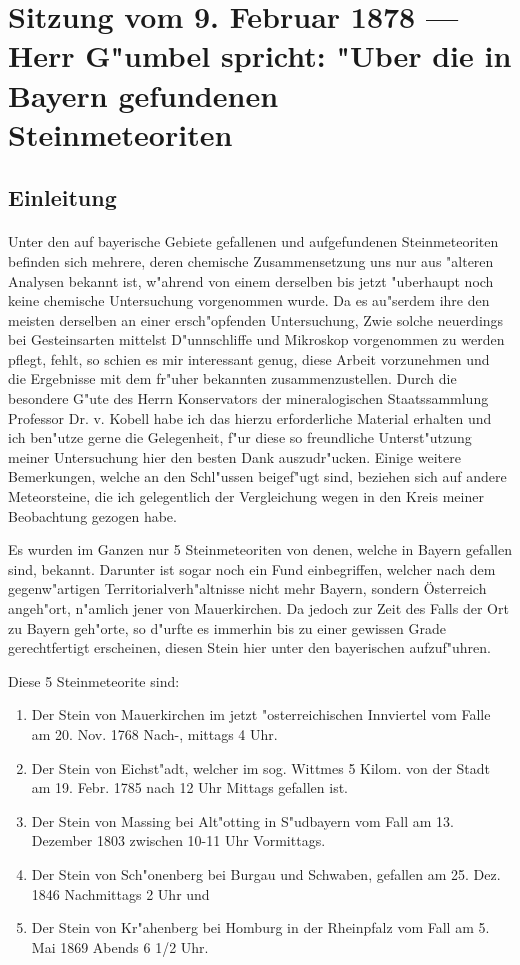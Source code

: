 \documentclass[a4paper, 11pt, oneside]{article}
\begin{document}
\section{Sitzung vom 9. Februar 1878 --- Herr G"umbel spricht: "Uber die in Bayern gefundenen Steinmeteoriten}
\subsection*{Einleitung}
\paragraph{}
Unter den auf bayerische Gebiete gefallenen und aufgefundenen Steinmeteoriten befinden sich mehrere, deren chemische Zusammensetzung uns nur aus "alteren Analysen bekannt ist, w"ahrend von einem derselben bis jetzt "uberhaupt noch keine chemische Untersuchung vorgenommen wurde. Da es au"serdem ihre den meisten derselben an einer ersch"opfenden Untersuchung, Zwie solche neuerdings bei Gesteinsarten mittelst D"unnschliffe und Mikroskop vorgenommen zu werden pflegt, fehlt, so schien es mir interessant genug, diese Arbeit vorzunehmen und die Ergebnisse mit dem fr"uher bekannten zusammenzustellen. Durch die besondere G"ute des Herrn Konservators der mineralogischen Staatssammlung Professor Dr. v. Kobell habe ich das hierzu erforderliche Material erhalten und ich ben"utze gerne die Gelegenheit, f"ur diese so freundliche Unterst"utzung meiner Untersuchung hier den besten Dank auszudr"ucken. Einige weitere Bemerkungen, welche an den Schl"ussen beigef"ugt sind, beziehen sich auf andere Meteorsteine, die ich gelegentlich der Vergleichung wegen in den Kreis meiner Beobachtung gezogen habe.

Es wurden im Ganzen nur 5 Steinmeteoriten von denen, welche in Bayern gefallen sind, bekannt. Darunter ist sogar noch ein Fund einbegriffen, welcher nach dem gegenw"artigen Territorialverh"altnisse nicht mehr Bayern, sondern Österreich angeh"ort, n"amlich jener von Mauerkirchen. Da jedoch zur Zeit des Falls der Ort zu Bayern geh"orte, so d"urfte es immerhin bis zu einer gewissen Grade gerechtfertigt erscheinen, diesen Stein hier unter den bayerischen aufzuf"uhren.

Diese 5 Steinmeteorite sind:
\begin{enumerate}
    \item Der Stein von Mauerkirchen im jetzt "osterreichischen Innviertel vom Falle am 20. Nov. 1768 Nach-, mittags 4 Uhr.
    \item Der Stein von Eichst"adt, welcher im sog. Wittmes 5 Kilom. von der Stadt am 19. Febr. 1785 nach 12 Uhr Mittags gefallen ist.
    \item Der Stein von Massing bei Alt"otting in S"udbayern vom Fall am 13. Dezember 1803 zwischen 10-11 Uhr Vormittags.
    \item Der Stein von Sch"onenberg bei Burgau und Schwaben, gefallen am 25. Dez. 1846 Nachmittags 2 Uhr und
    \item Der Stein von Kr"ahenberg bei Homburg in der Rheinpfalz vom Fall am 5. Mai 1869 Abends 6 1/2 Uhr.
\end{enumerate}
\end{document}
